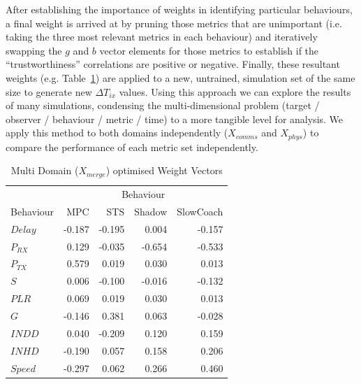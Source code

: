 \documentclass[conference]{IEEEtran}
\begin{document}
After establishing the importance of weights in identifying particular behaviours, a final weight is arrived at by pruning those metrics that are unimportant (i.e. taking the three most relevant metrics in each behaviour) and iteratively swapping the $g$ and $b$ vector elements for those metrics to establish if the ``trustworthiness'' correlations are positive or negative.
Finally, these resultant weights (e.g. Table~\ref{tab:full_metric_correlations}) are applied to a new, untrained, simulation set of the same size to generate new $\Delta T_{ix}$ values.
Using this approach we can explore the results of many simulations, condensing the multi-dimensional problem (target / observer / behaviour / metric / time) to a more tangible level for analysis.
We apply this method to both domains independently ($X_{comms}$ and $X_{phys}$) to compare the performance of each metric set independently.
%
\begin{table}
  \centering
  \caption{Multi Domain ($X_{merge}$) optimised Weight Vectors}
  \begin{tabular}{lrrrr}
    \toprule
    & \multicolumn{4}{c}{Behaviour} \\ \cmidrule(r){2-5}
    Behaviour & MPC & STS & Shadow & SlowCoach  \\
    \midrule
    $Delay$ & -0.187 & -0.195 & 0.004 & -0.157  \\
    $P_{RX}$ & 0.129 & -0.035 & -0.654 & -0.533  \\
    $P_{TX}$ & 0.579 & 0.019 & 0.030 & 0.013  \\
    $S$ & 0.006 & -0.100 & -0.016 & -0.132  \\
    $PLR$ & 0.069 & 0.019 & 0.030 & 0.013  \\
    $G$ & -0.146 & 0.381 & 0.063 & -0.028  \\
    $INDD$ & 0.040 & -0.209 & 0.120 & 0.159  \\
    $INHD$ & -0.190 & 0.057 & 0.158 & 0.206  \\
    $Speed$ & -0.297 & 0.062 & 0.266 & 0.460  \\
    \bottomrule
  \end{tabular}
  \label{tab:full_metric_correlations}
\end{table}
 
\end{document}
